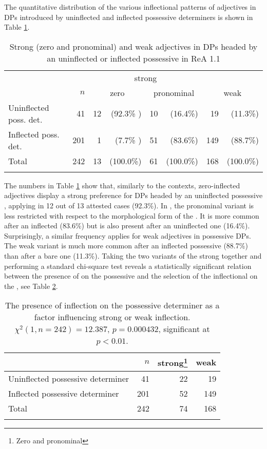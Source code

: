 \documentclass[output=paper,colorlinks,citecolor=brown]{langscibook}
\begin{document}
The quantitative distribution of the various inflectional patterns of
adjectives in DPs introduced by uninflected and inflected possessive
determiners is shown in Table \ref{ch6t3}.

\begin{table}[t]
\begin{tabular}{l r *3{r@{~}r}}
\lsptoprule
&     & \multicolumn{4}{c}{strong}     \\\cmidrule(lr){3-6}
& $n$ & \multicolumn{2}{c}{zero} & \multicolumn{2}{c}{pronominal} &\multicolumn{2}{c}{weak}\\
\midrule
Uninflected poss. det. & 41 & 12  & (92.3\% ) &  10  &(16.4\%)  &19   &(11.3\%)\\
Inflected poss. det. & 201&  1  & (7.7\%  ) &  51  &(83.6\%)  &149  &(88.7\%) \\
Total                                  & 242&  13 & (100.0\%) &  61  &(100.0\%)  & 168 &(100.0\%)  \\
\lspbottomrule
\end{tabular}
\caption{Strong (zero and pronominal) and weak adjectives in DPs headed by an uninflected
or inflected possessive  in ReA 1.1}\label{ch6t3}
\end{table}

The numbers in Table \ref{ch6t3} show that, similarly to the  contexts,
zero-inflected adjectives display a strong preference for DPs headed by
an uninflected possessive , applying in 12 out of 13 attested
cases (92.3\%). In , the pronominal variant is less restricted
with respect to the morphological form of the . It is more
common after an inflected  (83.6\%) but is also present after
an uninflected one (16.4\%). Surprisingly, a similar frequency applies
for weak adjectives in possessive DPs. The weak variant is much more
common after an inflected possessive  (88.7\%) than after a
bare one (11.3\%). Taking the two variants of the strong 
together and performing a standard chi-square test reveals a
statistically significant relation between the presence of  on
the possessive  and the selection of the inflectional 
on the , see Table \ref{ch6t4}.

\begin{table}[t]
\begin{tabular}{l rrr}
\lsptoprule
& $n$ & strong\footnote{Zero and pronominal} & weak  \\
\midrule
Uninflected possessive determiner & 41 & {22} & 19   \\
Inflected possessive determiner   &201 & {52} &149  \\
\midrule
Total & 242 & 74 &  168 \\
\lspbottomrule
\end{tabular}
\caption{The presence of inflection on the possessive determiner as a
factor influencing strong or weak  inflection. $\chi^2 (1, n=242)=12.387$, $p=0.000432$, significant at $p <0.01$.}\label{ch6t4}
\end{table}
\end{document}
